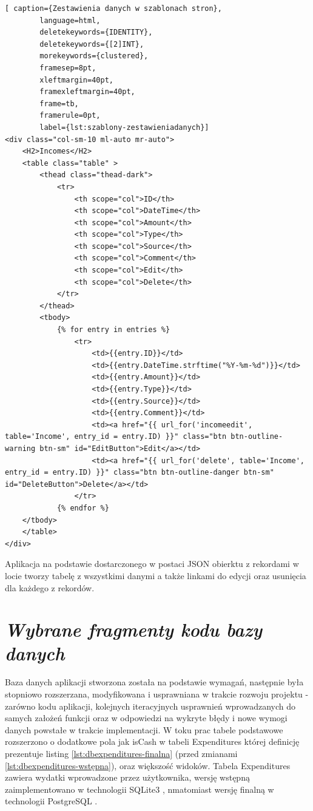 \documentclass[a4paper,10pt, twoside]{report}
\newcommand{\customstylesection}[1]{\textbf{\textit{#1}}}
\begin{document}
\begin{large}
\begin{minipage}{\textwidth}
    \begin{lstlisting}[ caption={Zestawienia danych w szablonach stron},
        language=html,
        deletekeywords={IDENTITY},
        deletekeywords={[2]INT},
        morekeywords={clustered},
        framesep=8pt,
        xleftmargin=40pt,
        framexleftmargin=40pt,
        frame=tb,
        framerule=0pt,
        label={lst:szablony-zestawieniadanych}]
<div class="col-sm-10 ml-auto mr-auto">
    <H2>Incomes</H2>
    <table class="table" >
        <thead class="thead-dark">
            <tr>
                <th scope="col">ID</th>
                <th scope="col">DateTime</th>
                <th scope="col">Amount</th>
                <th scope="col">Type</th>
                <th scope="col">Source</th>
                <th scope="col">Comment</th>
                <th scope="col">Edit</th>
                <th scope="col">Delete</th>
            </tr>
        </thead>
        <tbody>
            {% for entry in entries %}
                <tr>
                    <td>{{entry.ID}}</td>
                    <td>{{entry.DateTime.strftime("%Y-%m-%d")}}</td>
                    <td>{{entry.Amount}}</td>
                    <td>{{entry.Type}}</td>
                    <td>{{entry.Source}}</td>
                    <td>{{entry.Comment}}</td>
                    <td><a href="{{ url_for('incomeedit', table='Income', entry_id = entry.ID) }}" class="btn btn-outline-warning btn-sm" id="EditButton">Edit</a></td>
                    <td><a href="{{ url_for('delete', table='Income', entry_id = entry.ID) }}" class="btn btn-outline-danger btn-sm" id="DeleteButton">Delete</a></td>
                </tr>
            {% endfor %}
    </tbody>
    </table>
</div>\end{lstlisting}
\end{minipage}
{Aplikacja na podstawie dostarczonego w postaci JSON obierktu z rekordami w 
locie tworzy tabelę z wszystkimi danymi a także linkami do edycji oraz usunięcia
 dla każdego z rekordów.}

\section{\customstylesection{Wybrane fragmenty kodu bazy danych}}
{Baza danych aplikacji stworzona została na podstawie wymagań, następnie była 
stopniowo rozszerzana, modyfikowana i usprawniana w trakcie rozwoju projektu - 
zarówno kodu aplikacji, kolejnych iteracyjnych usprawnień wprowadzanych do 
samych założeń funkcji oraz w odpowiedzi na wykryte błędy i nowe wymogi danych 
powstałe w trakcie implementacji. W toku prac tabele podstawowe rozszerzono 
o dodatkowe pola jak isCash w tabeli Expenditures której definicję prezentuje 
listing \ref*{lst:dbexpenditures-finalna} (przed zmianami 
\ref*{lst:dbexpenditures-wstępna}), oraz większość widoków. Tabela Expenditures 
zawiera wydatki wprowadzone przez użytkownika, wersję wstępną zaimplementowano 
w technologii SQLite3 \cite{SQLite}, nmatomiast wersję finalną w technologii 
PostgreSQL \cite{PostgreSQL}.}


\end{large}
\end{document}
